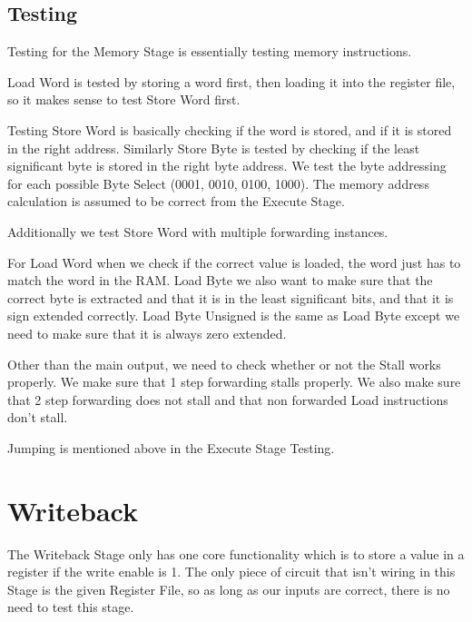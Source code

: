 \documentclass{article}
\begin{document}
\subsection{Testing}
Testing for the Memory Stage is essentially testing memory instructions.\\\vspace{-.2cm}

\noindent 
Load Word is tested by storing a word first, then loading it into the register file, so it makes sense to test Store Word first.\\\vspace{-.2cm}

\noindent 
Testing Store Word is basically checking if the word is stored, and if it is stored in the right address. Similarly Store Byte is tested by checking if the least significant byte is stored in the right byte address. We test the byte addressing for each possible Byte Select (0001, 0010, 0100, 1000). The memory address calculation is assumed to be correct from the Execute Stage. \\\vspace{-.2cm}

\noindent 
Additionally we test Store Word with multiple forwarding instances.\\\vspace{-.2cm}

\noindent 
For Load Word when we check if the correct value is loaded, the word just has to match the word in the RAM. Load Byte we also want to make sure that the correct byte is extracted and that it is in the least significant bits, and that it is sign extended correctly. Load Byte Unsigned is the same as Load Byte except we need to make sure that it is always zero extended.\\\vspace{-.2cm}

\noindent 
Other than the main output, we need to check whether or not the Stall works properly. We make sure that 1 step forwarding stalls properly. We also make sure that 2 step forwarding does not stall and that non forwarded Load instructions don't stall. \\ \vspace{-.2cm}

\noindent Jumping is mentioned above in the Execute Stage Testing.

\section{Writeback}
The Writeback Stage only has one core functionality which is to store a value in a register if the write enable is 1. The only piece of circuit that isn't wiring in this Stage is the given Register File, so as long as our inputs are correct, there is no need to test this stage.
\end{document}
